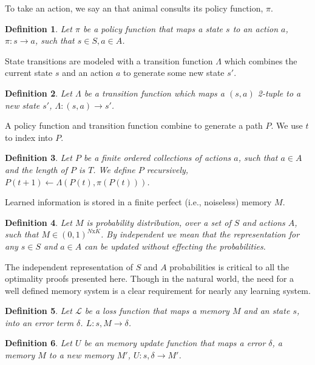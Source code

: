 \documentclass[9pt,twocolumn,twoside]{pnas-new}
\newtheorem{definition}{Definition}
\begin{document}
To take an action, we say an that animal consults its policy function, $\pi$. 

\begin{definition}
    Let $\pi$ be a policy function that maps a state $s$ to an action $a$, $\pi : s \rightarrow a$, such that $s \in S, a \in A$.
\end{definition}

State transitions are modeled with a transition function $\Lambda$ which combines the current state $s$ and an action $a$ to generate some new state $s'$.

\begin{definition}
    Let $\Lambda$ be a transition function which maps a $(s,a)$ 2-tuple to a new state $s'$, $\Lambda : (s, a) \rightarrow s'$.     
\end{definition}

A policy function and transition function combine to generate a path $P$. We use $t$ to index into $P$. 

\begin{definition}
    Let $P$ be a finite ordered collections of actions $a$, such that $a \in A$ and the length of $P$ is $T$. We define $P$ recursively, $P(t+1) \leftarrow \Lambda(P(t), \pi(P(t)))$.
\end{definition}

Learned information is stored in a finite perfect (i.e., noiseless) memory $M$. 
    
\begin{definition}
    Let $M$ is probability distribution, over a set of $S$ and actions $A$, such that $M \in (0, 1)^{N\text{x}K}$. By independent we mean that the representation for any $s \in S$ and $a \in A$ can be updated without effecting the probabilities. 
\end{definition}

The independent representation of $S$ and $A$ probabilities is critical to all the optimality proofs presented here. Though in the natural world, the need for a well defined memory system is a clear requirement for nearly any learning system.

\begin{definition}
    Let $\mathcal{L}$ be a loss function that maps a memory $M$ and an state $s$, into an error term $\delta$. $L : s, M \rightarrow \delta$.
\end{definition}

\begin{definition}
    Let $U$ be an memory update function that maps a error $\delta$, a memory $M$ to a new memory $M'$, $U : s, \delta \rightarrow M'$.
\end{definition}
\end{document}
